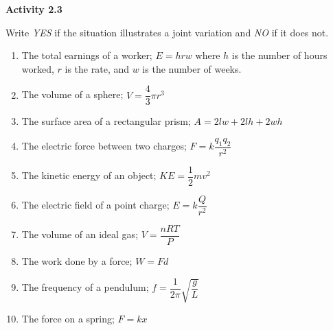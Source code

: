 \vspace{0.3ex}
\noindent\textbf{Activity 2.3}

\vspace{0.2ex}

Write \emph{YES} if the situation illustrates a joint variation and \emph{NO} if it does not.

\begin{enumerate}[noitemsep, label = \color{blue}\arabic*. ]
   \item The total earnings of a worker; $E = hrw$ where $h$ is the number of hours worked, $r$ is the rate, and $w$ is the number of weeks.
   \item The volume of a sphere; $V = \dfrac{4}{3} \pi r^3$
   \item The surface area of a rectangular prism; $A = 2lw + 2lh + 2wh$
   \item The electric force between two charges; $F = k \dfrac{q_1 q_2}{r^2}$
   \item The kinetic energy of an object; $KE = \dfrac{1}{2}mv^2$
   \item The electric field of a point charge; $E = k \dfrac{Q}{r^2}$
   \item The volume of an ideal gas; $V = \dfrac{nRT}{P}$
   \item The work done by a force; $W = Fd$
   \item The frequency of a pendulum; $f = \dfrac{1}{2\pi} \sqrt{\dfrac{g}{L}}$
   \item The force on a spring; $F = kx$
\end{enumerate}
